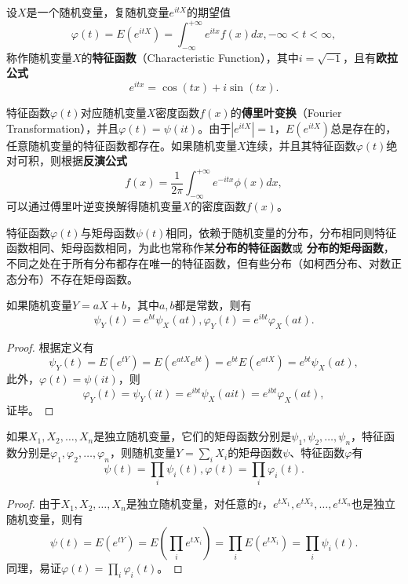 \begin{definition}[特征函数]
设$X$是一个随机变量，复随机变量$e^{itX}$的期望值
\[
    \varphi(t) = E(e^{itX}) = \int_{-\infty}^{+\infty} e^{itx} f(x)dx, -\infty < t < \infty,
\]
称作随机变量$X$的\textbf{特征函数}（Characteristic Function），其中$i=\sqrt{-1}$，且有\textbf{欧拉公式}
\[
    e^{itx} = \cos(tx) + i \sin(tx).
\]
\end{definition}
特征函数$\varphi(t)$对应随机变量$X$密度函数$f(x)$的\textbf{傅里叶变换}（Fourier Transformation），并且$\varphi(t)=\psi(it)$。由于$|e^{itX}|=1$，$E(e^{itX})$总是存在的，任意随机变量的特征函数都存在。如果随机变量$X$连续，并且其特征函数$\varphi(t)$绝对可积，则根据\textbf{反演公式}
\[
    f(x) = \frac{1}{2\pi} \int_{-\infty}^{+\infty} e^{-itx} \phi(x) dx,
\]
可以通过傅里叶逆变换解得随机变量$X$的密度函数$f(x)$。

特征函数$\varphi(t)$与矩母函数$\psi(t)$相同，依赖于随机变量的分布，分布相同则特征函数相同、矩母函数相同，为此也常称作某\textbf{分布的特征函数}或
\textbf{分布的矩母函数}，不同之处在于所有分布都存在唯一的特征函数，但有些分布（如柯西分布、对数正态分布）不存在矩母函数。

\begin{property}
如果随机变量$Y=aX+b$，其中$a,b$都是常数，则有
\[
    \psi_Y(t)=e^{bt} \psi_X(at),\varphi_Y(t)=e^{ibt}\varphi_X(at).
\]
\end{property}
\begin{proof}
根据定义有
\[
    \psi_Y(t) = E(e^{tY}) = E(e^{atX}e^{bt}) = e^{bt}E(e^{atX}) = e^{bt} \psi_X(at),
\]
此外，$\varphi(t)=\psi(it)$，则
\[
    \varphi_Y(t) = \psi_Y(it) = e^{ibt} \psi_X(ait) = e^{ibt}\varphi_X(at),
\]
证毕。
\end{proof}

\begin{property}
如果$X_1,X_2,\ldots,X_n$是独立随机变量，它们的矩母函数分别是$\psi_1,\psi_2,\ldots,\psi_n$，特征函数分别是$\varphi_1,\varphi_2,\ldots,\varphi_n$，则随机变量$Y=\sum\limits_i X_i$的矩母函数$\psi$、特征函数$\varphi$有
\[
    \psi(t) = \prod\limits_i \psi_i(t), \varphi(t) = \prod\limits_i \varphi_i(t).
\]
\end{property}
\begin{proof}
由于$X_1,X_2,\ldots,X_n$是独立随机变量，对任意的$t$，$e^{tX_1},e^{tX_2},\ldots,e^{tX_n}$也是独立随机变量，则有
\[
    \psi(t) = E(e^{tY}) = E(\prod\limits_i e^{tX_i}) = \prod\limits_i E(e^{tX_i}) = \prod\limits_i \psi_i(t).
\]
同理，易证$\varphi(t) = \prod\limits_i \varphi_i(t)$。

\end{proof}

